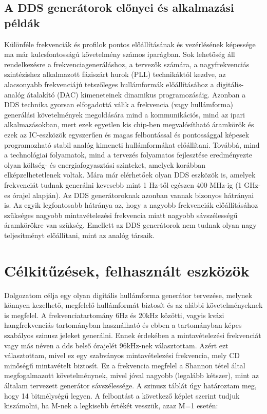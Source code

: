 \documentclass[a4paper,12pt]{article}
\begin{document}
			\subsection{A DDS generátorok előnyei és alkalmazási példák}
			Különféle frekvenciák és profilok pontos előállításának és vezérlésének képessége ma már kulcsfontosságú követelmény számos iparágban. Sok lehetőség áll rendelkezésre a frekvenciageneráláshoz, a tervezők számára, a nagyfrekvenciás szintézishez alkalmazott fáziszárt hurok (PLL) technikáktól kezdve, az alacsonyabb frekvenciájú tetszőleges hullámformák előállításához a digitális-analóg átalakító (DAC) kimeneteinek dinamikus programozásáig. Azonban a DDS technika gyorsan elfogadottá válik a frekvencia (vagy hullámforma) generálási követelmények megoldására mind a kommunikációs, mind az ipari alkalmazásokban, mert ezek egyetlen kis chip-ben megvalósítható áramkörök és ezek az IC-eszközök egyszerűen és magas felbontással és pontossággal képesek programozható stabil analóg kimeneti hullámformákat előállítani. Továbbá, mind a technológiai folyamatok, mind a tervezés folyamatos fejlesztése eredményezte olyan költség- és energiafogyasztási szinteket, amelyek korábban elképzelhetetlenek voltak. Mára már elérhetőek olyan DDS eszközök is, amelyek frekvenciát tudnak generálni kevesebb mint 1 Hz-től egészen 400 MHz-ig (1 GHz-es órajel alapján). 
			Az DDS generátoroknak azonban vannak bizonyos hátrányai is. Az egyik legfontosabb hátránya az, hogy a nagyobb frekvenciák előállításához szükséges nagyobb mintavételezési frekvencia miatt nagyobb sávszélességű áramkörökre van szükség. Emellett az DDS generátorok nem tudnak olyan nagy teljesítményt előállítani, mint az analóg társaik.
		

		\newpage
	\section{Célkitűzések, felhasznált eszközök}
	Dolgozatom célja egy olyan digitális hullámforma generátor tervezése, melynek könnyen kezelhető, megfelelő hullámformát biztosít és az alábbi követelményeknek is megfelel.
	A frekvenciatartomány 6Hz és 20kHz közötti, vagyis kvázi hangfrekvenciás tartományban használható és ebben a tartományban képes szabályos szinusz jeleket generálni. Ennek érdekében a mintavételezési frekvenciát vagy más néven a dds belső órajelét 96kHz-nek választottam. Azért ezt választottam, mivel ez egy szabványos mintavételezési frekvencia, mely CD minőségű mintavételt biztosít. Ez a frekvencia megfelel a Shannon tétel által megfogalmazott követelménynek, mivel jóval nagyobb (legalább kétszer), mint az általam tervezett generátor sávszélessége. A szinusz táblát úgy határoztam meg, hogy 14 bitmélységű legyen. A felbontást a következő képlet szerint tudjuk kiszámolni, ha M-nek a legkisebb értékét vesszük, azaz M=1 esetén: 
 
\end{document}

